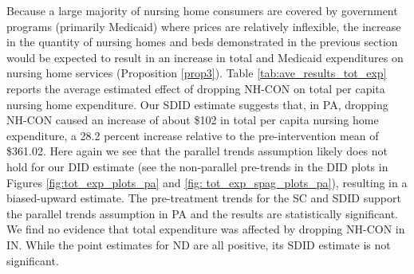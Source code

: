\documentclass[../Main.tex]{subfiles}
\begin{document}
Because a large majority of nursing home consumers are covered by government programs (primarily Medicaid) where prices are relatively inflexible, the increase in the quantity of nursing homes and beds demonstrated in the previous section would be expected to result in an increase in total and Medicaid expenditures on nursing home services (Proposition \ref{prop3}). Table \ref{tab:ave_results_tot_exp} reports the average estimated effect of dropping NH-CON on total per capita nursing home expenditure. Our SDID estimate suggests that, in PA, dropping NH-CON caused an increase of about \$102 in total per capita nursing home expenditure, a 28.2 percent increase relative to the pre-intervention mean of \$361.02. Here again we see that the parallel trends assumption likely does not hold for our DID estimate (see the non-parallel pre-trends in the DID plots in Figures \ref{fig:tot_exp_plots_pa} and \ref{fig: tot_exp_spag_plots_pa}), resulting in a biased-upward estimate. The pre-treatment trends for the SC and SDID support the parallel trends assumption in PA and the results are statistically significant. We find no evidence that total expenditure was affected by dropping NH-CON in IN. While the point estimates for ND are all positive, its SDID estimate is not significant.\\
\end{document}
